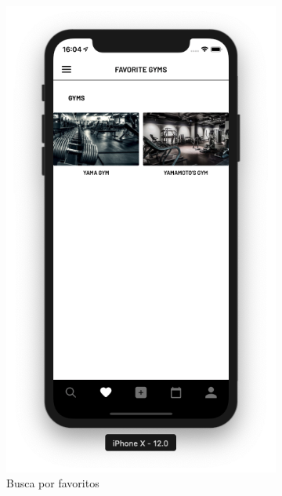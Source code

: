 \begin{figure}[H]
	\centering
    \begin{subfigure}[b]{0.4\textwidth}
        \includegraphics[width=\textwidth]{pfc/figuras/tr-favorite.png}
        \caption{Busca por favoritos}
        \label{fig:tr-favorite}
    \end{subfigure}
    ~
	\begin{subfigure}[b]{0.4\textwidth}

\end{subfigure}
\end{figure}
